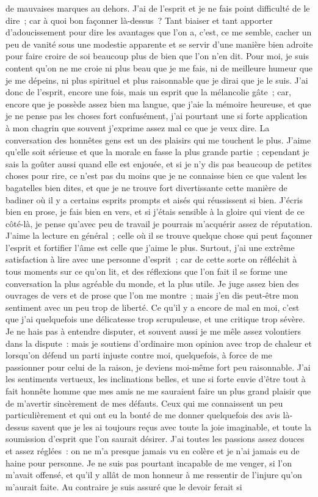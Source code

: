 \documentclass[french,twoside]{book} %
\begin{document}
de mauvaises marques au dehors. J’ai de l’esprit et je ne fais point difficulté de le dire ; car à quoi bon façonner là-dessus ? Tant biaiser et tant apporter d’adoucissement pour dire les avantages que l’on a, c’est, ce me semble, cacher un peu de vanité sous une modestie apparente et se servir d’une manière bien adroite pour faire croire de soi beaucoup plus de bien que l’on n’en dit. Pour moi, je suis content qu’on ne me croie ni plus beau que je me fais, ni de meilleure humeur que je me dépeins, ni plus spirituel et plus raisonnable que je dirai que je le suis. J’ai donc de l’esprit, encore une fois, mais un esprit que la mélancolie gâte ; car, encore que je possède assez bien ma langue, que j’aie la mémoire heureuse, et que je ne pense pas les choses fort confusément, j’ai pourtant une si forte application à mon chagrin que souvent j’exprime assez mal ce que je veux dire. La conversation des honnêtes gens est un des plaisirs qui me touchent le plus. J’aime qu’elle soit sérieuse et que la morale en fasse la plus grande partie ; cependant je sais la goûter aussi quand elle est enjouée, et si je n’y dis pas beaucoup de petites choses pour rire, ce n’est pas du moins que je ne connaisse bien ce que valent les bagatelles bien dites, et que je ne trouve fort divertissante cette manière de badiner où il y a certains esprits prompts et aisés qui réussissent si bien. J’écris bien en prose, je fais bien en vers, et si j’étais sensible à la gloire qui vient de ce côté-là, je pense qu’avec peu de travail je pourrais m’acquérir assez de réputation. J’aime la lecture en général ; celle où il se trouve quelque chose qui peut façonner l’esprit et fortifier l’âme est celle que j’aime le plus. Surtout, j’ai une extrême satisfaction à lire avec une personne d’esprit ; car de cette sorte on réfléchit à tous moments sur ce qu’on lit, et des réflexions que l’on fait il se forme une conversation la plus agréable du monde, et la plus utile. Je juge assez bien des ouvrages de vers et de prose que l’on me montre ; mais j’en dis peut-être mon sentiment avec un peu trop de liberté. Ce qu’il y a encore de mal en moi, c’est que j’ai quelquefois une délicatesse trop scrupuleuse, et une critique trop sévère. Je ne hais pas à entendre disputer, et souvent aussi je me mêle assez volontiers dans la dispute : mais je soutiens d’ordinaire mon opinion avec trop de chaleur et lorsqu’on défend un parti injuste contre moi, quelquefois, à force de me passionner pour celui de la raison, je deviens moi-même fort peu raisonnable. J’ai les sentiments vertueux, les inclinations belles, et une si forte envie d’être tout à fait honnête homme que mes amis ne me sauraient faire un plus grand plaisir que de m’avertir sincèrement de mes défauts. Ceux qui me connaissent un peu particulièrement et qui ont eu la bonté de me donner quelquefois des avis là-dessus savent que je les ai toujours reçus avec toute la joie imaginable, et toute la soumission d’esprit que l’on saurait désirer. J’ai toutes les passions assez douces et assez réglées : on ne m’a presque jamais vu en colère et je n’ai jamais eu de haine pour personne. Je ne suis pas pourtant incapable de me venger, si l’on m’avait offensé, et qu’il y allât de mon honneur à me ressentir de l’injure qu’on m’aurait faite. Au contraire je suis assuré que le devoir ferait si 
\end{document}
